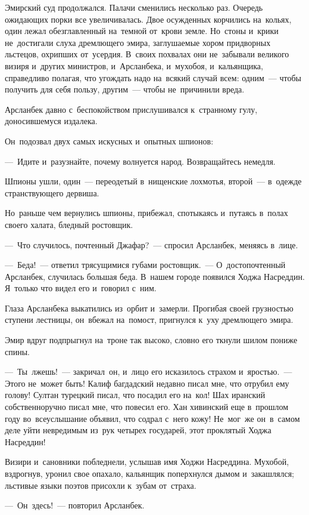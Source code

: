 \documentclass[12pt,a4paper]{book}
\begin{document}
Эмирский суд продолжался. Палачи сменились несколько раз. Очередь ожидающих порки все увеличивалась. Двое осужденных корчились на~кольях, один лежал обезглавленный на~темной от~крови земле. Но~стоны и~крики не~достигали слуха дремлющего эмира, заглушаемые хором придворных льстецов, охрипших от~усердия. В~своих похвалах они не~забывали великого визиря и~других министров, и~Арсланбека, и~мухобоя, и~кальянщика, справедливо полагая, что угождать надо на~всякий случай всем: одним~— чтобы получить для себя пользу, другим~— чтобы не~причинили вреда.

Арсланбек давно с~беспокойством прислушивался к~странному гулу, доносившемуся издалека.

Он~подозвал двух самых искусных и~опытных шпионов:

—~Идите и~разузнайте, почему волнуется народ. Возвращайтесь немедля.

Шпионы ушли, один~— переодетый в~нищенские лохмотья, второй~— в~одежде странствующего дервиша.

Но~раньше чем вернулись шпионы, прибежал, спотыкаясь и~путаясь в~полах своего халата, бледный ростовщик.

—~Что случилось, почтенный Джафар?~— спросил Арсланбек, меняясь в~лице.

—~Беда!~— ответил трясущимися губами ростовщик.~— О~достопочтенный Арсланбек, случилась большая беда. В~нашем городе появился Ходжа Насреддин. Я~только что видел его и~говорил с~ним.

Глаза Арсланбека выкатились из~орбит и~замерли. Прогибая своей грузностью ступени лестницы, он~вбежал на~помост, пригнулся к~уху дремлющего эмира.

Эмир вдруг подпрыгнул на~троне так высоко, словно его ткнули шилом пониже спины.

—~Ты~лжешь!~— закричал~он, и~лицо его исказилось страхом и~яростью.~— Этого не~может быть! Калиф багдадский недавно писал мне, что отрубил ему голову! Султан турецкий писал, что посадил его на~кол! Шах иранский собственноручно писал мне, что повесил его. Хан хивинский еще в~прошлом году во~всеуслышание объявил, что содрал с~него кожу! Не~мог~же он~в~самом деле уйти невредимым из~рук четырех государей, этот проклятый Ходжа Насреддин!

Визири и~сановники побледнели, услышав имя Ходжи Насреддина. Мухобой, вздрогнув, уронил свое опахало, кальянщик поперхнулся дымом и~закашлялся; льстивые языки поэтов присохли к~зубам от~страха.

—~Он~здесь!~— повторил Арсланбек.
\end{document}
